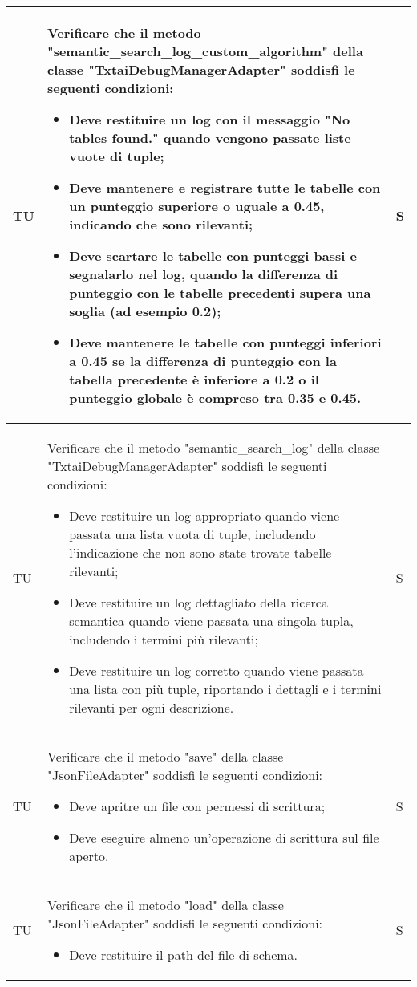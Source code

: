 \begin{adjustwidth}{-0.5cm}{-0.5cm}
\begin{longtable}{|P{1.5cm}|>{\raggedright}P{9.5cm}|>{\arraybackslash}P{1.5cm}|}
		\hline TU & Verificare che il metodo "semantic_search_log_custom_algorithm" della classe "TxtaiDebugManagerAdapter" soddisfi le seguenti condizioni:
		\begin{itemize}
			\item Deve restituire un log con il messaggio "No tables found." quando vengono passate liste vuote di tuple;
			\item Deve mantenere e registrare tutte le tabelle con un punteggio superiore o uguale a 0.45, indicando che sono rilevanti;
			\item Deve scartare le tabelle con punteggi bassi e segnalarlo nel log, quando la differenza di punteggio con le tabelle precedenti supera una soglia (ad esempio 0.2);
			\item Deve mantenere le tabelle con punteggi inferiori a 0.45 se la differenza di punteggio con la tabella precedente è inferiore a 0.2 o il punteggio globale è compreso tra 0.35 e 0.45.
		\end{itemize} & S \\

		\hline TU & Verificare che il metodo "semantic\_search\_log" della classe "TxtaiDebugManagerAdapter" soddisfi le seguenti condizioni:
		\begin{itemize}
			\item Deve restituire un log appropriato quando viene passata una lista vuota di tuple, includendo l'indicazione che non sono state trovate tabelle rilevanti;
			\item Deve restituire un log dettagliato della ricerca semantica quando viene passata una singola tupla, includendo i termini più rilevanti;
			\item Deve restituire un log corretto quando viene passata una lista con più tuple, riportando i dettagli e i termini rilevanti per ogni descrizione.
		\end{itemize} & S \\

		\hline TU & Verificare che il metodo "save" della classe "JsonFileAdapter" soddisfi le seguenti condizioni:
		\begin{itemize}
			\item Deve apritre un file con permessi di scrittura;
			\item Deve eseguire almeno un'operazione di scrittura sul file aperto.
		\end{itemize} & S \\

		\hline TU & Verificare che il metodo "load" della classe "JsonFileAdapter" soddisfi le seguenti condizioni:
		\begin{itemize}
			\item Deve restituire il path del file di schema.
		\end{itemize} & S \\


\end{longtable}
\end{adjustwidth}

